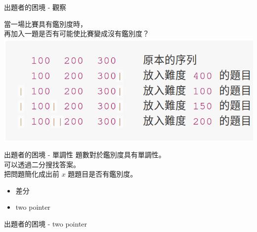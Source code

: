 \documentclass[xcolor=table]{beamer}
\begin{document}
\begin{frame}{出題者的困境 - 觀察}
    
    當一場比賽具有鑑別度時，\\
    再加入一題是否有可能使比賽變成沒有鑑別度？\\[3mm]
    \pause
    \includegraphics[scale=0.35]{img/contest_example.png}
\end{frame}

\begin{frame}{出題者的困境 - 單調性}
    題數對於鑑別度具有單調性。\\
    可以透過二分搜找答案。\\
    把問題簡化成出前 $x$ 題題目是否有鑑別度。\\[1mm]
    
    \begin{itemize}
        \item 差分
        \item two pointer
    \end{itemize}
\end{frame}

\begin{frame}{出題者的困境 - two pointer}
    
\end{frame}
\end{document}
